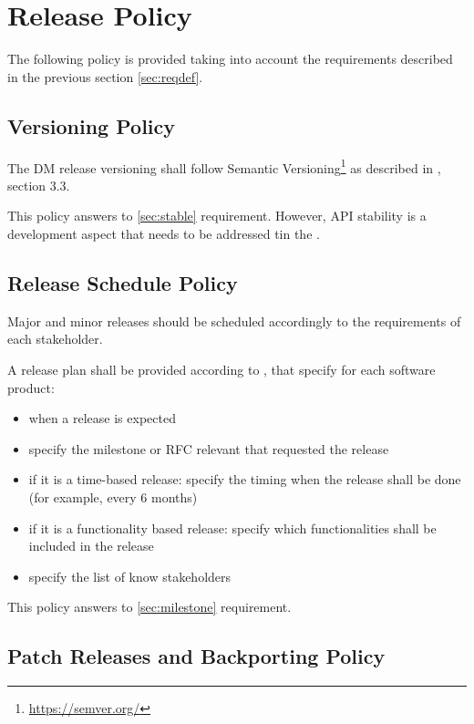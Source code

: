 \section{Release Policy} \label{sec:policy}

The following policy is provided taking into account the requirements described in the previous section \ref{sec:reqdef}.


\subsection{Versioning Policy} \label{sec:versinopolicy}

The DM release versioning shall follow Semantic Versioning\footnote{\url{https://semver.org/}} as described in , section 3.3.

This policy answers to \ref{sec:stable} requirement.
However, API stability is a development aspect that needs to be addressed tin the .


\subsection{Release Schedule Policy} \label{sec:schedulepolicy}

Major and minor releases should be scheduled accordingly to the requirements of each stakeholder.

A release plan shall be provided according to , that specify for each software product:

\begin{itemize}
\item when a release is expected
\item specify the milestone or RFC relevant that requested the release
\item if it is a time-based release: specify the timing when the release shall be done (for example, every 6 months)
\item if it is a functionality based release: specify which functionalities shall be included in the release
\item specify the list of know stakeholders
\end{itemize}

This policy answers to \ref{sec:milestone} requirement.


\subsection{Patch Releases and Backporting Policy} \label{sec:patchpolicy}

